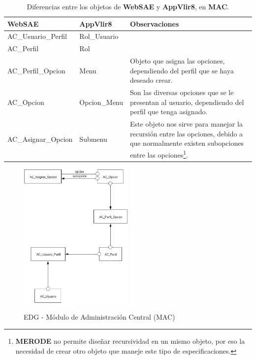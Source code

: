 \begin{indentar}
\begin{table}
	\begin{center}
	\begin{tabular}{|p{1.5in}|p{1.5in}|p{1.8in}|}
		\hline
		\textbf{WebSAE} & \textbf{AppVlir8} & \textbf{Observaciones} \\
		\hline\hline
		  AC\_Usuario\_Perfil	& Rol\_Usuario &  \\
		\hline
		  AC\_Perfil				& Rol		 		&  \\
		\hline
		  AC\_Perfil\_Opcion		& Menu	 		& Objeto que asigna las opciones, dependiendo del perfil que se haya deseado crear. \\
		\hline
		  AC\_Opcion				& Opcion\_Menu	& Son las diversas opciones que se le presentan al usuario, dependiendo del perfil que tenga asignado.  \\
		\hline
		  AC\_Asignar\_Opcion	& Submenu 		& Este objeto nos sirve para manejar la recursi\'on entre las opciones, debido a que normalmente existen subopciones entre las opciones\footnote{\textbf{MERODE} no permite dise\~nar recursividad en un mismo objeto, por eso la necesidad de crear otro objeto que maneje este tipo de especificaciones.}. \\
		\hline
	\end{tabular}
	\caption{Diferencias entre los objetos de \textbf{WebSAE} y \textbf{AppVlir8}, en \textbf{MAC}.}\label{diferencias:websae-appvlir8-mac}
	\end{center}
\end{table}

\begin{figure}
  \centering
    {\includegraphics[width=0.5\textwidth]{images/merode-mac.eps}}
  \caption{EDG - M\'odulo de Administraci\'on Central (MAC)}
  \label{edg:mac}
\end{figure}


\end{indentar}
